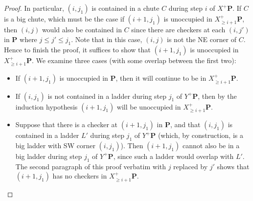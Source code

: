 \documentclass[11pt,reqno]{amsart} %
\newcommand{\bfP}{\mathbf{P}}
\theoremstyle{definition}
\begin{document}
\begin{proof}
In particular, $(i,j_1)$ is contained in a chute $C$ during step $i$ of $X^+\bfP$.
If $C$ is a big chute, which must be the case if $(i+1,j_1)$ is unoccupied in $X^+_{\geq i+1}\bfP$, then $(i,j)$ would also be contained in $C$ since there are checkers at each $(i,j')$ in $\bfP$ where $j\leq j'\leq j_1$.
Note that in this case, $(i,j)$ is not the NE corner of $C$.
Hence to finish the proof, it suffices to show that $(i+1,j_1)$ is unoccupied in $X^+_{\geq i+1} \bfP$.
We examine three cases (with some overlap between the first two):

\begin{itemize}
\item
If $(i+1,j_1)$ is unoccupied in $\bfP$, then it will continue to be in $X^+_{\geq i+1} \bfP$.

\item
If $(i,j_1)$ is not contained in a ladder during step $j_1$ of $Y^+\bfP$, then by the induction hypothesis $(i+1,j_1)$ will be unoccupied in $X^+_{\geq i+1} \bfP$.

\item
Suppose that there is a checker at $(i+1,j_1)$ in $\bfP$, and that $(i,j_1)$ is contained in a ladder $L'$ during step $j_1$ of $Y^+\bfP$ (which, by construction, is a big ladder with SW corner $(i,j_1)$).
Then $(i+1,j_1)$ cannot also be in a big ladder during step $j_1$ of $Y^+\bfP$, since such a ladder would overlap with $L'$.
The second paragraph of this proof verbatim with $j$ replaced by $j'$ shows that $(i+1,j_1)$ has no checkers in $X^+_{\geq i+1}\bfP$.
\qedhere
\end{itemize}
\end{proof}
\end{document}
